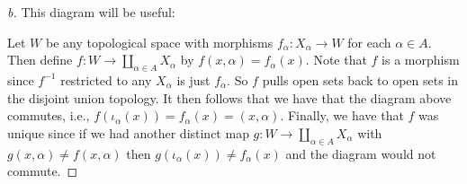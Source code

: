 \documentclass[leqno]{article}
\theoremstyle{nonumberplain}
\newtheorem{proof}{Proof}
\begin{document}
\begin{proof}[b]
This diagram will be useful:

\centering
{}

Let $W$ be any topological space with morphisms $f_\alpha \colon X_\alpha \to W$ for each $\alpha \in A$.  Then define $f \colon W \to \coprod_{\alpha \in A} X_\alpha$ by $f(x,\alpha)=f_\alpha (x)$.  Note that $f$ is a morphism since $f^{-1}$ restricted to any $X_\alpha$ is just $f_\alpha$. So $f$ pulls open sets back to open sets in the disjoint union topology.  It then follows that we have that the diagram above commutes, i.e., $f(\iota_\alpha (x))=f_\alpha (x)= (x,\alpha)$.  Finally, we have that $f$ was unique since if we had another distinct map $g\colon W \to \coprod_{\alpha \in A} X_\alpha$ with $g(x,\alpha) \neq f(x,\alpha)$ then $g(\iota_\alpha(x))\neq f_\alpha(x)$ and the diagram would not commute.
\end{proof}


\pagebreak
\end{document}
